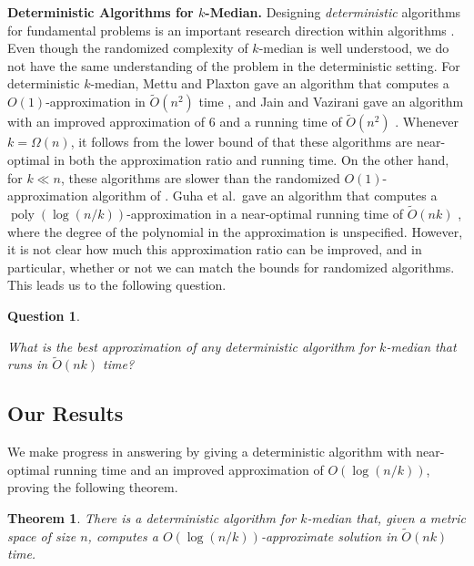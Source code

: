 \documentclass[11pt]{article}
\newenvironment{wrapper}[1]
{
\begin{center}
		\begin{minipage}{\linewidth}
			\begin{mdframed}[hidealllines=true, backgroundcolor=gray!20, leftmargin=0cm,innerleftmargin=0.4cm,innerrightmargin=0.4cm,innertopmargin=0.4cm,innerbottommargin=0.4cm,roundcorner=0pt]
				#1}
			{\end{mdframed}
		\end{minipage}
	\end{center}
}
\newcommand{\1}{\mathmybb{1}}
\newtheorem{theorem}{Theorem}[section]
\newtheorem{question}{Question}
\DeclareMathOperator*{\poly}{poly}
\begin{document}
\medskip
\noindent \textbf{Deterministic Algorithms for $k$-Median.}
Designing \emph{deterministic} algorithms for fundamental problems is an important research direction within algorithms \cite{focs/Cohen-AddadSS23,focs/HaeuplerLS24,stoc/AssadiCS22,talg/NeimanS16, HLRW24}.
Even though the randomized complexity of $k$-median is well understood, we do not have the same understanding of the problem in the deterministic setting.
For deterministic $k$-median,
Mettu and Plaxton gave an algorithm that computes a $O(1)$-approximation in $\tilde O(n^2)$ time \cite{MettuP00}, and Jain and Vazirani gave an algorithm with an improved approximation of $6$ and a running time of $\tilde O(n^2)$ \cite{jain2001approximation}. 
Whenever $k = \Omega(n)$, it follows from the lower bound of \cite{MettuP02} that these algorithms are near-optimal in both the approximation ratio and running time. 
On the other hand, for $k \ll n$, these algorithms are slower than the randomized $O(1)$-approximation algorithm of \cite{MettuP02}.
Guha et al.~gave an algorithm that computes a $\poly(\log(n/k))$-approximation in a near-optimal running time of $\tilde O(nk)$ \cite{focs/GuhaMMO00}, where the degree of the polynomial in the approximation is unspecified. However, it is not clear how much this approximation ratio can be improved, and in particular, whether or not we can match the bounds for randomized algorithms. This leads us to the following question.

\begin{wrapper}
\begin{question}\label{Q1}
\begin{center}
What is the best approximation of any deterministic algorithm for $k$-median that runs in $\tilde O(nk)$ time?
\end{center}
\end{question}
\end{wrapper}


\subsection{Our Results}

We make progress in answering  by giving a deterministic algorithm with near-optimal running time and an improved approximation of $O(\log(n/k))$, proving the following theorem.

\begin{theorem}\label{thm:main:fast}
    There is a deterministic algorithm for $k$-median that, given a metric space of size $n$, computes a $O(\log(n/k))$-approximate solution in $\tilde O(nk)$ time.
\end{theorem}
\end{document}
